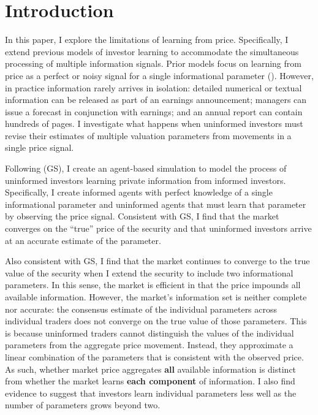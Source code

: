 \documentclass[11pt]{article}
\begin{document}
\section{Introduction}
\label{sec:org21e97a0}
In this paper, I explore the limitations of learning from price. Specifically, I extend previous models of investor learning to accommodate the simultaneous processing of multiple information signals. Prior models focus on learning from price as a perfect or noisy signal for a single informational parameter (\citet{grossmanImpossibilityInformationallyEfficient1980,diamondInformationAggregationNoisy1981}). However, in practice information rarely arrives in isolation: detailed numerical or textual information can be released as part of an earnings announcement; managers can issue a forecast in conjunction with earnings; and an annual report can contain hundreds of pages. I investigate what happens when uninformed investors must revise their estimates of multiple valuation parameters from movements in a single price signal. 

Following \citet{grossmanImpossibilityInformationallyEfficient1980} (GS), I create an agent-based simulation to model the process of uninformed investors learning private information from informed investors. Specifically, I create informed agents with perfect knowledge of a single informational parameter and uninformed agents that must learn that parameter by observing the price signal. Consistent with GS, I find that the market converges on the ``true'' price of the security and that uninformed investors arrive at an accurate estimate of the parameter. 

Also consistent with GS, I find that the market continues to converge to the true value of the security when I extend the security to include two informational parameters. In this sense, the market is efficient in that the price impounds all available information. However, the market's information set is neither complete nor accurate: the consensus estimate of the individual parameters across individual traders does not converge on the true value of those parameters. This is because uninformed traders cannot distinguish the values of the individual parameters from the aggregate price movement. Instead, they approximate a linear combination of the parameters that is consistent with the observed price. As such, whether market price aggregates \textbf{all} available information is distinct from whether the market learns \textbf{each component} of information. I also find evidence to suggest that investors learn individual parameters less well as the number of parameters grows beyond two.
\end{document}
